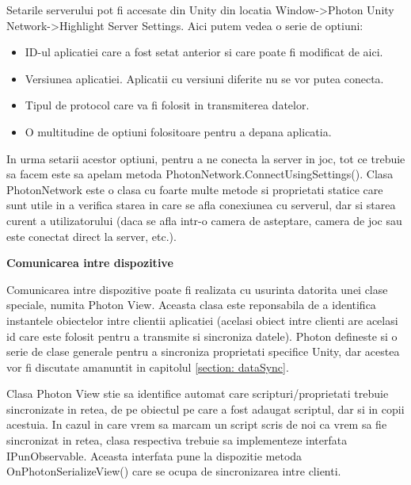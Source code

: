 \documentclass[12pt, a4paper]{article}
\begin{document}
	Setarile serverului pot fi accesate din Unity din locatia Window->Photon Unity Network->Highlight Server Settings. Aici putem vedea o serie de optiuni:
	
	\begin{itemize}
		\item ID-ul aplicatiei care a fost setat anterior si care poate fi modificat de aici.
		\item Versiunea aplicatiei. Aplicatii cu versiuni diferite nu se vor putea conecta.
		\item Tipul de protocol care va fi folosit in transmiterea datelor.
		\item O multitudine de optiuni folositoare pentru a depana aplicatia.
	\end{itemize}

	In urma setarii acestor optiuni, pentru a ne conecta la server in joc, tot ce trebuie sa facem este sa apelam metoda PhotonNetwork.ConnectUsingSettings(). Clasa PhotonNetwork este o clasa cu foarte multe metode si proprietati statice care sunt utile in a verifica starea in care se afla conexiunea cu serverul, dar si starea curent a utilizatorului (daca se afla intr-o camera de asteptare, camera de joc sau este conectat direct la server, etc.).
	\newline
	

	
	
	\textbf{Comunicarea intre dispozitive}
	\newline
	
	Comunicarea intre dispozitive poate fi realizata cu usurinta datorita unei clase speciale, numita Photon View. Aceasta clasa este reponsabila de a identifica instantele obiectelor intre clientii aplicatiei (acelasi obiect intre clienti are acelasi id care este folosit pentru a transmite si sincroniza datele). Photon defineste si o serie de clase generale pentru a sincroniza proprietati specifice Unity, dar acestea vor fi discutate amanuntit in capitolul \ref{section: dataSync}.
	\newline
	
	Clasa Photon View stie sa identifice automat care scripturi/proprietati trebuie sincronizate in retea, de pe obiectul pe care a fost adaugat scriptul, dar si in copii acestuia. In cazul in care vrem sa marcam un script scris de noi ca vrem sa fie sincronizat in retea, clasa respectiva trebuie sa implementeze interfata IPunObservable. Aceasta interfata pune la dispozitie metoda OnPhotonSerializeView() care se ocupa de sincronizarea intre clienti.
	\newline
	
\end{document}
